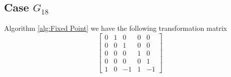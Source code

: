 \documentclass{article}
\theoremstyle{plain}
\theoremstyle{definition}
\newcommand{\tand}{\ensuremath{\,\,\, \text{and} \,\,\,}}
\begin{document}
\subsection{Case $G_{18}$}
Algorithm \ref{alg:Fixed Point} we have the following transformation matrix 
$$
 \left[ \begin {array}{ccccc} 0&1&0&0&0\\ 0&0&1&0&0
\\ 0&0&0&1&0\\ 0&0&0&0&1
\\ 1&0&-1&1&-1\end {array} \right]
$$
\end{document}
